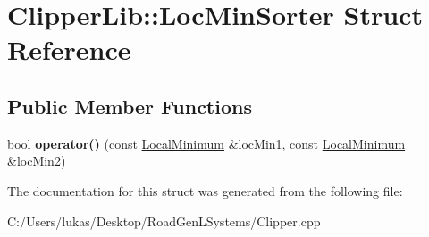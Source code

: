 \hypertarget{struct_clipper_lib_1_1_loc_min_sorter}{}\section{Clipper\+Lib\+:\+:Loc\+Min\+Sorter Struct Reference}
\label{struct_clipper_lib_1_1_loc_min_sorter}
\subsection*{Public Member Functions}
\begin{DoxyCompactItemize}
\item 
\hypertarget{struct_clipper_lib_1_1_loc_min_sorter_a4e5cd20cdd73b95700e91e61a8de5c06}{}\label{struct_clipper_lib_1_1_loc_min_sorter_a4e5cd20cdd73b95700e91e61a8de5c06} 
bool {\bfseries operator()} (const \hyperlink{struct_clipper_lib_1_1_local_minimum}{Local\+Minimum} \&loc\+Min1, const \hyperlink{struct_clipper_lib_1_1_local_minimum}{Local\+Minimum} \&loc\+Min2)
\end{DoxyCompactItemize}


The documentation for this struct was generated from the following file\+:\begin{DoxyCompactItemize}
\item 
C\+:/\+Users/lukas/\+Desktop/\+Road\+Gen\+L\+Systems/Clipper.\+cpp\end{DoxyCompactItemize}

